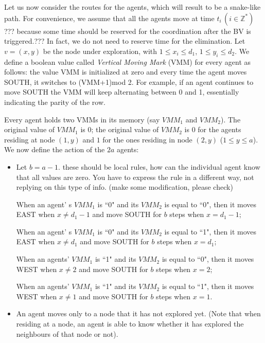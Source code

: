 Let us now consider the routes for the agents, which will result to be a snake-like path. For convenience, we assume that all the agents move at time $t_i\,(i\in\mathbb{Z}^*)$  \color{blue} ??? because some time should be reserved for the coordination after the BV is triggered.??? In fact, we do not need to reserve time for the elimination. \color{black} 
Let $v=(x, y)$ be the node under exploration, with $1\leq x_i \leq d_1$, $1\leq y_i \leq d_2$. 
We define a boolean value called {\em Vertical Moving Mark}  (VMM) for every agent as follows: 
the value  VMM is initialized at zero and    every time   the agent moves SOUTH, it switches to  (VMM+1)mod 2. 
  For example, if an agent continues to move SOUTH  the VMM will keep alternating between 0 and 1, essentially indicating the parity of the row.
  
Every agent holds two VMMs in its memory  (say $VMM_1$ and $VMM_2$). 
The original value of $VMM_1$ is $0$; 
the original value of $VMM_2$ is 0 for the agents 
residing at node $(1, y)$ and  $1$ for the ones residing in node  $(2, y)$ ($1\leq y\leq a$).
We now define the action of the $2a$ agents:\\ 
\begin{itemize}
\item Let $b=a-1$. 
\color{blue} these should be local rules, how can the individual agent know that all values are zero. You have to express the rule in a different way, not replying on this type of info. (make some modification, please check)\color{black}

When an agent' s $VMM_1$ is ``0" and its $VMM_2$ is equal to ``0", then it moves EAST when $x\neq d_1-1$ and move SOUTH for $b$ steps when $x=d_1-1$;

When an agent' s $VMM_1$ is ``0" and its $VMM_2$ is equal to ``1", then it moves EAST when $x\neq d_1$ and move SOUTH for $b$ steps  when $x=d_1$;

When an agents' $VMM_1$ is ``1" and its $VMM_2$ is equal to ``0", then it moves WEST when $x\neq2$ and move SOUTH for $b$ steps when $x=2$;

When an agents' $VMM_1$ is ``1" and its $VMM_2$ is equal to ``1",  then it moves WEST when $x\neq 1$ and move SOUTH for $b$ steps when $x=1$.




\item An agent  moves only to a node that it has not explored yet. (Note that when residing at a node, an agent is able to know whether it has explored the neighbours of that node or not).
\end{itemize}

